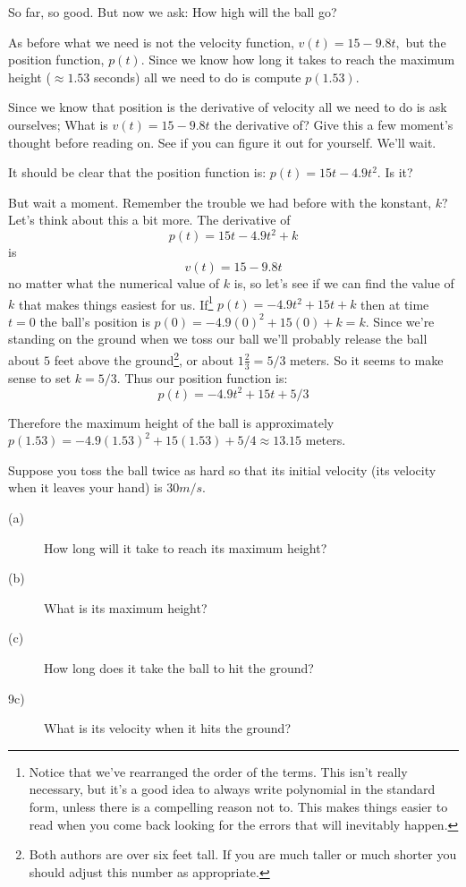 So far, so good.  But now we ask: How high will the ball go? 

As before what we need is not the velocity function, $v(t) =15-9.8t,$
but the position function, $p(t).$ Since we know how long it takes to
reach the maximum height ($\approx 1.53$ seconds) all we need to do is
compute $p(1.53).$

Since we know that position is the derivative of velocity all we need
to do is ask ourselves; What is $v(t) = 15-9.8t$ the derivative of?
Give this a few moment's thought before reading on. See if you can
figure it out for yourself. We'll wait.

It should be clear that the position function is: $p(t) = 15t-4.9t^2.$
Is it?

But wait a moment. Remember the trouble we had before with the
konstant, $k?$ Let's think about this a bit more. The derivative of 
$$
p(t) = 15t-4.9t^2 +k
$$
is
$$
v(t) =15-9.8t
$$
no matter what the numerical value of $k$ is, so let's see if we can
find the value of $k$ that makes things easiest for
us. If\footnote{Notice that we've rearranged the order of the
  terms. This isn't really necessary, but it's a good idea to always
  write polynomial in the standard form, unless there is a compelling
  reason not to. This makes things easier to read when you come back
  looking for the errors that will inevitably happen.}  $p(t) =
-4.9t^2+15t +k$ then at time $t=0$ the ball's position is $p(0) =
-4.9(0)^2+15(0) +k = k.$ Since we're standing on the ground when we
toss our ball we'll probably release the ball about $5$ feet above the
ground\footnote{Both authors are over six feet tall. If you are much
  taller or much shorter you should adjust this number as
  appropriate.}, or about $1\frac{2}{3} = 5/3$ meters. So it seems to
make sense to set $k=5/3.$ Thus our position function is:
$$
p(t) = -4.9t^2+15t +  5/3
$$

Therefore the maximum height of the ball is approximately $p(1.53) =
-4.9(1.53)^2+15(1.53) +  5/4 \approx 13.15$ meters.

\begin{embeddedproblem}{}
  Suppose you toss the ball twice as hard so that its initial velocity
  (its velocity when it leaves your hand) is $30 m/s.$ 
  \begin{description}
  \item[(a)] How long will it take to reach its maximum height?
  \item[(b)] What is its maximum height?
  \item[(c)] How long does it take the ball to hit the ground?
  \item[9c)] What is its velocity when it hits the ground?
  \end{description}
\end{embeddedproblem}

